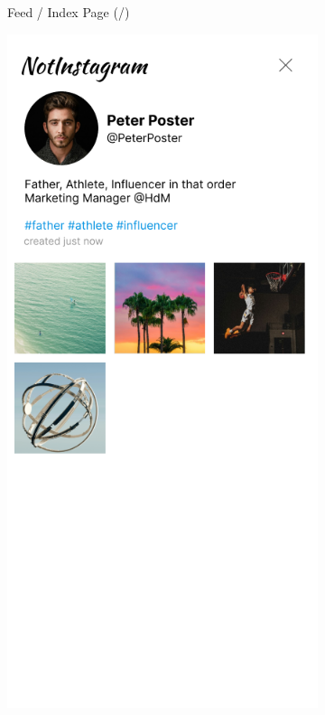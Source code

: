 \documentclass[a4paper, 10pt]{article}
\begin{document}
\begin{figure}[ht!]
\begin{subfigure}{0.49\linewidth}
\begin{center}
    \end{center}
    \caption{Feed / Index Page (/)}\label{subfig:index}
  \end{subfigure}
  \begin{subfigure}{0.49\linewidth}
    \begin{center}
      \includegraphics[width=\linewidth, height=0.3\textheight, keepaspectratio]{img/ig-clone/Profil.png}

\end{center}
\end{subfigure}
\end{figure}
\end{document}
